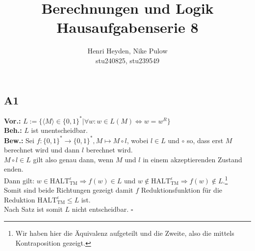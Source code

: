 \documentclass[12pt, a4paper]{article}
\title{Berechnungen und Logik\\Hausaufgabenserie 8}
\author{Henri Heyden, Nike Pulow \\ \small stu240825, stu239549}
\date{}
\newcommand*{\qed}{\null\nobreak\hfill\ensuremath{\square}}
\newcommand*{\gap}{\text{ }}
\newcommand*{\vor}{\textbf{Vor.:} \gap}
\newcommand*{\beh}{\textbf{Beh.:} \gap}
\newcommand*{\bew}{\textbf{Bew.:} \gap}
\newcommand{\HALT}{\text{HALT}_\text{TM}^\epsilon}
\begin{document}
\maketitle

\doublespacing
\vspace*{-2cm}
\subsection*{A1}
\vor \(L := \{\langle M \rangle \in \{0,1\}^* | \forall w : w \in L(M) \Leftrightarrow w = w^R\}\) \\
\beh \(L\) ist unentscheidbar. \\
\bew Sei \(f : \{0,1\}^* \rightarrow \{0,1\}^*, M \mapsto M \circ l\), wobei \(l \in L\) und \(\circ\) so, dass erst \(M\) berechnet wird und dann \(l\) berechnet wird.\\
\(M \circ l \in L\) gilt also genau dann, wenn \(M\) und \(l\) in einem akzeptierenden Zustand enden. \\
Dann gilt: \(w \in \HALT \Rightarrow f(w) \in L\) und \(w \not\in \HALT \Rightarrow f(w) \not\in L\).\footnote[1]{Wir haben hier die Äquivalenz aufgeteilt und die Zweite, also die  mittels Kontraposition gezeigt.} \\
Somit sind beide Richtungen gezeigt damit \(f\) Reduktionsfunktion für die Reduktion \(\HALT \le L\) ist. \\
Nach Satz  ist somit \(L\) nicht entscheidbar. \qed
\end{document}
